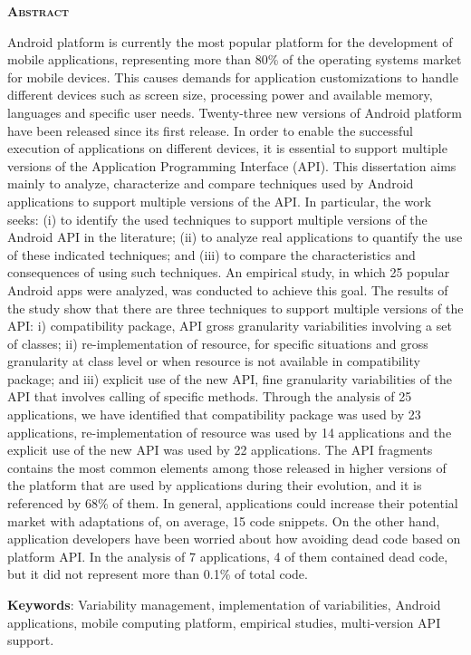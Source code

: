 
\begin{center}
	\Large{\textsc{\textbf{Abstract}}}
\end{center}

\noindent Android platform is currently the most popular platform for the development
of mobile applications, representing more than 80\% of the operating systems market
for mobile devices. This causes demands for application customizations to handle
different devices such as screen size, processing power and available memory, languages
​​and specific user needs. Twenty-three new versions of Android platform have been
released since its first release. In order to enable the successful execution of
applications on different devices, it is essential to support multiple versions of
the Application Programming Interface (API). This dissertation aims mainly to analyze,
characterize and compare techniques used by Android applications to support multiple
versions of the API. In particular, the work seeks: (i) to identify the used techniques
to support multiple versions of the Android API in the literature; (ii) to analyze real
applications to quantify the use of these indicated techniques; and (iii) to compare the
characteristics and consequences of using such techniques. An empirical study, in which
25 popular Android apps were analyzed, was conducted to achieve this goal. The results
of the study show that there are three techniques to support multiple versions of the
API: i) compatibility package, API gross granularity variabilities involving a set of
classes; ii) re-implementation of resource, for specific situations and gross granularity
at class level or when resource is not available in compatibility package; and iii)
explicit use of the new API, fine granularity variabilities of the API that involves
calling of specific methods. Through the analysis of 25 applications, we have identified
that compatibility package was used by 23 applications, re-implementation of resource was
used by 14 applications and the explicit use of the new API was used by 22 applications.
The API fragments contains the most common elements among those released in higher versions
of the platform that are used by applications during their evolution, and it is referenced
by 68\% of them. In general, applications could increase their potential market with adaptations
of, on average, 15 code snippets. On the other hand, application developers have been worried
about how avoiding dead code based on platform API. In the analysis of 7 applications, 4 of
them contained dead code, but it did not represent more than 0.1\% of total code.

\noindent\textbf{Keywords}:  Variability management, implementation of variabilities,
Android applications, mobile computing platform, empirical studies, multi-version API support.
